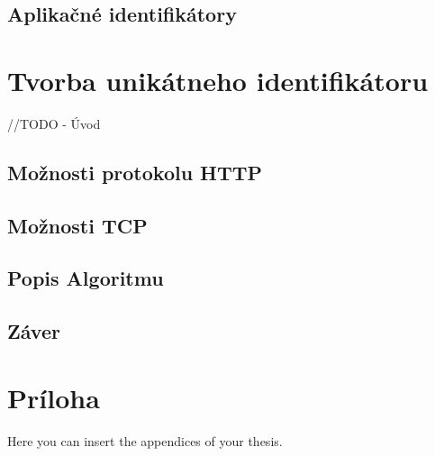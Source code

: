 \documentclass[
  printed, %
  table,   %
  lof,     %
  lot,     %
]{fithesis3}
\begin{document}
\section{Aplikačné identifikátory}

\chapter{Tvorba unikátneho identifikátoru}
\label{ch:footprint}
//TODO - Úvod
\section{Možnosti protokolu HTTP}
\section{Možnosti TCP}
\section{Popis Algoritmu}

\section{Záver}

\makeatletter\thesis@blocks@clear\makeatother
{} %
\printindex

\appendix %
\chapter{Príloha}
Here you can insert the appendices of your thesis.
\end{document}
